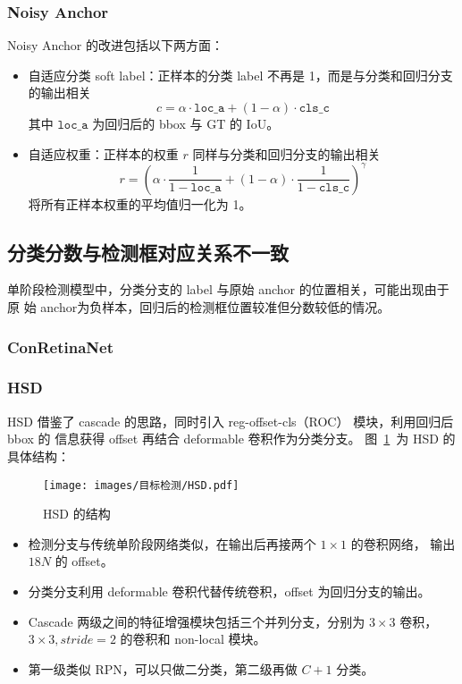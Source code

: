 \subsubsection{Noisy Anchor}
Noisy Anchor 的改进包括以下两方面：

\begin{itemize}
  \item 自适应分类 soft label：正样本的分类 label 不再是 1，而是与分类和回归分支
    的输出相关
    \begin{equation}
      c = \alpha \cdot \mathtt{loc\_a} + (1 - \alpha) \cdot \mathtt{cls\_c}
    \end{equation}
    其中 $\mathtt{loc\_a}$ 为回归后的 bbox 与 GT 的 IoU。
  \item 自适应权重：正样本的权重 $r$ 同样与分类和回归分支的输出相关
    \begin{equation}
      r = {\left( \alpha \cdot \frac{1}{1-\mathtt{loc\_a}} + (1 - \alpha) \cdot \frac{1}{1-\mathtt{cls\_c}} \right )} ^ {\gamma}
    \end{equation}
    将所有正样本权重的平均值归一化为 1。
\end{itemize}

\subsection{分类分数与检测框对应关系不一致}
单阶段检测模型中，分类分支的 label 与原始 anchor 的位置相关，可能出现由于原
始 anchor为负样本，回归后的检测框位置较准但分数较低的情况。

\subsubsection{ConRetinaNet}

\subsubsection{HSD}
HSD 借鉴了 cascade 的思路，同时引入 reg-offset-cls（ROC） 模块，利用回归后 bbox 的
信息获得 offset 再结合 deformable 卷积作为分类分支。
图~\ref{fig:hsd}~为 HSD 的具体结构：

\begin{figure}[ht]
  \centering
  \texttt{[image: images/目标检测/HSD.pdf]}
  \caption{HSD 的结构}\label{fig:hsd}
\end{figure}

\begin{itemize}
  \item 检测分支与传统单阶段网络类似，在输出后再接两个 $1 \times 1$ 的卷积网络，
    输出 $18N$ 的 offset。 
  \item 分类分支利用 deformable 卷积代替传统卷积，offset 为回归分支的输出。
  \item Cascade 两级之间的特征增强模块包括三个并列分支，分别为 $3 \times 3$ 卷积，
    $3 \times 3, stride=2$ 的卷积和 non-local 模块。
  \item 第一级类似 RPN，可以只做二分类，第二级再做 $C+1$ 分类。
\end{itemize}


